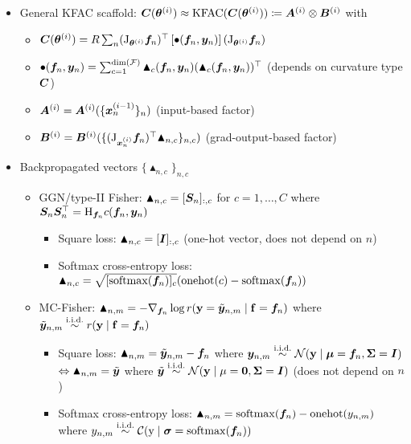\begin{itemize}
  \item General KFAC scaffold: \qquad
    $
    {\bm{C}}({\bm{\theta}}^{(i)})
    \approx
    \mathrm{KFAC}({\bm{C}}({\bm{\theta}}^{(i)}))
    \coloneqq {\bm{A}}^{(i)} \otimes {\bm{B}}^{(i)}
    $
  \quad with
  \begin{itemize}
    \item ${\bm{C}}({\bm{\theta}}^{(i)})
    = R \sum_n
    (\mathrm{J}_{{\bm{\theta}}^{(i)}} {\bm{f}}_n)^{\top}
    \left[ \bullet({\bm{f}}_n, {\bm{y}}_n) \right]
    (\mathrm{J}_{{\bm{\theta}}^{(i)}} {\bm{f}}_n)$
    \item $\bullet({\bm{f}}_n, {\bm{y}}_n) = \sum_{c=1}^{\dim({\mathcal{F}})} \blacktriangle_c({\bm{f}}_n, {\bm{y}}_n) (\blacktriangle_c({\bm{f}}_n, {\bm{y}}_n))^{\top}$ \quad (depends on curvature type ${\bm{C}}$)
    \item ${\bm{A}}^{(i)} = {\bm{A}}^{(i)}( \{{\bm{x}}_{n}^{(i-1)}\}_n )$ \quad (input-based factor)
    \item ${\bm{B}}^{(i)} = {\bm{B}}^{(i)}( \{ (\mathrm{J}_{{\bm{x}}_n^{(i)}}{\bm{f}}_{n})^{\top} \blacktriangle_{n,c}\}_{n,c})$ \quad (grad-output-based factor)
  \end{itemize}
  \item Backpropagated vectors $\{ \blacktriangle_{n,c} \}_{n,c}$
    \begin{itemize}
    \item GGN/type-II Fisher: $\blacktriangle_{n,c} = [{\bm{S}}_n]_{:,c}$ for $c = 1, \dots, C$ where ${\bm{S}}_n {\bm{S}}_n^{\top} = \mathrm{H}_{{\bm{f}}_n} c({\bm{f}}_n, {\bm{y}}_n)$
      \begin{itemize}
      \item Square loss: $\blacktriangle_{n,c} = [{\bm{I}}]_{:,c}$  (one-hot vector, does not depend on $n$)
      \item Softmax cross-entropy loss: $\blacktriangle_{n,c} =  \sqrt{[\mathrm{softmax}({\bm{f}}_n)]_c} (\mathrm{onehot}(c) - \mathrm{softmax}({\bm{f}}_n))$
      \end{itemize}

    \item MC-Fisher: $\blacktriangle_{n,m} = - \nabla_{{\bm{f}}_n} \log r({\mathbf{y}} = \tilde{{\bm{y}}}_{n,m} \mid {\mathbf{f}} = {\bm{f}}_n)$ where $\tilde{\vy}_{n,m} \stackrel{\text{\iid}}{\sim} r(\rvy \mid \rvf = \vf_n)$
      \begin{itemize}
      \item Square loss: $\blacktriangle_{n,m} = \tilde{{\bm{y}}}_{n,m} - {\bm{f}}_n$ where $\vy_{n,m} \stackrel{\text{\iid}}{\sim} \gN(\rvy \mid \vmu = \vf_n, \mSigma = \mI)$\\
        $\Leftrightarrow \blacktriangle_{n,m} = \tilde{{\bm{y}}}$ where $\tilde{\vy} \stackrel{\text{\iid}}{\sim} \gN(\rvy \mid \mu = \vzero, \mSigma = \mI)$ (does not depend on $n$)
        \item Softmax cross-entropy loss: $\blacktriangle_{n,m} = \mathrm{softmax}({\bm{f}}_n) - \mathrm{onehot}(y_{n,m})$ where $y_{n,m} \stackrel{\text{\iid}}{\sim} \gC(\ry \mid \vsigma = \softmax(\vf_n))$
      \end{itemize}


\end{itemize}
\end{itemize}

